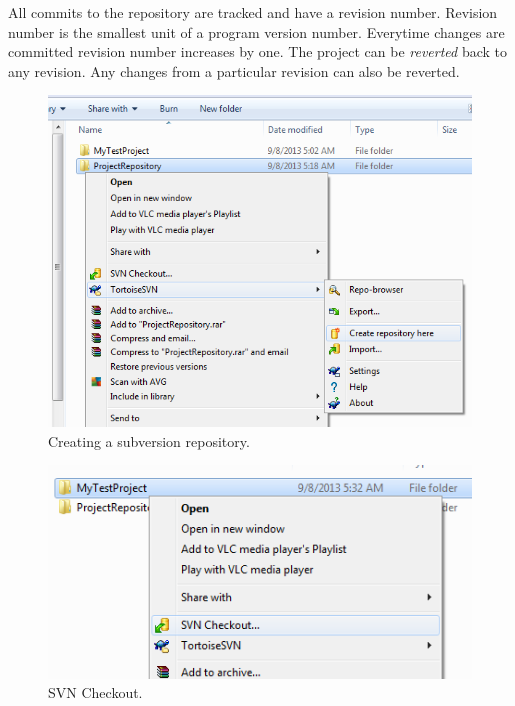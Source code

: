 \documentclass[12pt,a4paper]{article}
\begin{document}
All commits to the repository are tracked and have a revision number. Revision number is the smallest unit of a program version number. Everytime changes are committed revision number increases by one. The project can be \textit{reverted} back to any revision. Any changes from a particular revision can also be reverted.
\begin{figure}[H]
\centering
\includegraphics[scale=0.75]{CreatingaRepository.png}
\caption{Creating a subversion repository.}
\label{Creating-subversion-repository}
\end{figure}
\begin{figure}[H]
\centering
\includegraphics[scale=0.75]{SVNCheckout.png}
\caption{SVN Checkout.}
\label{SVNCheckout}
\end{figure}
\end{document}
